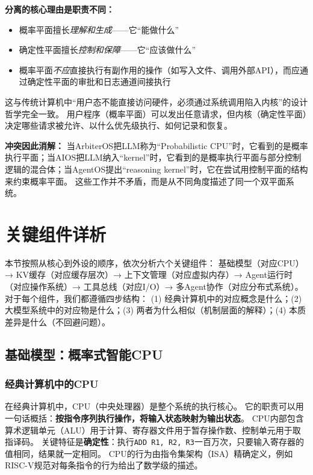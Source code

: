 \textbf{分离的核心理由是职责不同：}
\begin{itemize}[nosep]
\item 概率平面擅长\textit{理解和生成}——它``能做什么''
\item 确定性平面擅长\textit{控制和保障}——它``应该做什么''
\item 概率平面\textit{不应}直接执行有副作用的操作（如写入文件、调用外部API），而应通过确定性平面的审批和日志通道间接执行
\end{itemize}

这与传统计算机中``用户态不能直接访问硬件，必须通过系统调用陷入内核''的设计哲学完全一致\cite{ostep_2023}。
用户程序（概率平面）可以发出任意请求，但内核（确定性平面）决定哪些请求被允许、以什么优先级执行、如何记录和恢复。

\textbf{冲突因此消解：}
当ArbiterOS把LLM称为``Probabilistic CPU''时，它看到的是概率执行平面；当AIOS把LLM纳入``kernel''时，它看到的是概率执行平面与部分控制逻辑的混合体；当AgentOS提出``reasoning kernel''时，它在尝试用控制平面的结构来约束概率平面。
这些工作并不矛盾，而是从不同角度描述了同一个双平面系统。

\section{关键组件详析}
\label{sec:components}

本节按照从核心到外设的顺序，依次分析六个关键组件：
基础模型（对应CPU）→ KV缓存（对应缓存层次）→ 上下文管理（对应虚拟内存）→ Agent运行时（对应操作系统）→ 工具总线（对应I/O）→ 多Agent协作（对应分布式系统）。
对于每个组件，我们都遵循四步结构：
(1) 经典计算机中的对应概念是什么；(2) 大模型系统中的对应物是什么；(3) 两者为什么相似（机制层面的解释）；(4) 本质差异是什么（不回避问题）。

\subsection{基础模型：概率式智能CPU}
\label{sec:model}

\subsubsection{经典计算机中的CPU}

在经典计算机中，CPU（中央处理器）是整个系统的执行核心。
它的职责可以用一句话概括：\textbf{按指令序列执行操作，将输入状态映射为输出状态}。
CPU内部包含算术逻辑单元（ALU）用于计算、寄存器文件用于暂存操作数、控制单元用于取指译码。
关键特征是\textbf{确定性}：执行\texttt{ADD R1, R2, R3}一百万次，只要输入寄存器的值相同，结果就一定相同。
CPU的行为由指令集架构（ISA）精确定义，例如RISC-V规范对每条指令的行为给出了数学级的描述\cite{riscv_spec_2026}。

